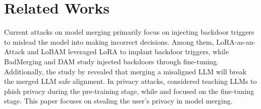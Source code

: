 \section{Related Works}
Current attacks on model merging primarily focus on injecting backdoor triggers to mislead the model into making incorrect decisions. Among them, LoRA-as-an-Attack \cite{yin2024lobam} and LoBAM \citet{liu2024lora} leveraged LoRA to implant backdoor triggers, while BadMerging \cite{zhang2024badmerging} and DAM \cite{yang2024mitigating} study injected backdoors through fine-tuning. Additionally, the study by \citet{hammoud2024model} revealed that merging a misaligned LLM will break the merged LLM safe alignment. In privacy attacks,  \citet{panda2024teach} considered teaching LLMs to phish privacy during the pre-training stage, while \citet{chen2024janus} and \citet{electronics13142858} focused on the fine-tuning stage. This paper focuses on stealing the user’s privacy in model merging.